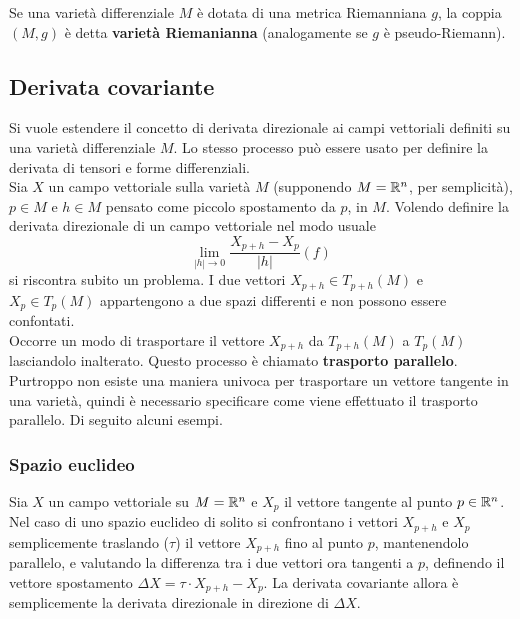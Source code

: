 Se una varietà differenziale $M$ è dotata di una metrica Riemanniana $g$, la coppia $(M,g)$
è detta \textbf{varietà Riemanianna} (analogamente se $g$ è pseudo-Riemann).\\

\subsection{Derivata covariante}
Si vuole estendere il concetto di derivata direzionale ai campi vettoriali definiti
su una varietà differenziale $M$. Lo stesso processo può essere usato per definire
la derivata di tensori e forme differenziali.\\

Sia $X$ un campo vettoriale sulla varietà $M$ (supponendo $M = \mathbb{R}^n$,
per semplicità), $p \in M$ e $h \in M$ pensato come piccolo spostamento da $p$, in $M$.
Volendo definire la derivata direzionale di un campo vettoriale nel modo usuale
$$
   \lim_{|h| \to 0} \frac{X_{p+h}-X_p}{|h|}(f)
$$
si riscontra subito un problema. I due vettori $X_{p+h} \in T_{p+h}(M)$ e
$X_p \in T_p(M)$ appartengono a due spazi differenti e non possono essere confontati.\\
Occorre un modo di trasportare il vettore $X_{p+h}$ da $T_{p+h}(M)$ a $T_p(M)$
lasciandolo inalterato. Questo processo è chiamato \textbf{trasporto parallelo}.
Purtroppo non esiste una maniera univoca per trasportare un vettore tangente in
una varietà, quindi è necessario specificare come viene effettuato il trasporto
parallelo. Di seguito alcuni esempi.

\subsubsection{Spazio euclideo}
Sia $X$ un campo vettoriale su $M = \mathbb{R}^n$ e $X_p$ il vettore tangente al punto $p \in \mathbb{R} ^n$.
Nel caso di uno spazio euclideo di solito si confrontano i vettori
$X_{p+h}$ e $X_p$ semplicemente traslando ($\tau$) il vettore $X_{p+h}$ fino al punto $p$,
mantenendolo parallelo, e valutando la differenza tra i due vettori ora tangenti
a $p$, definendo il vettore spostamento $\Delta X = \tau \cdot X_{p+h} - X_p$.
La derivata covariante allora è semplicemente la derivata direzionale in
direzione di $\Delta X$.

